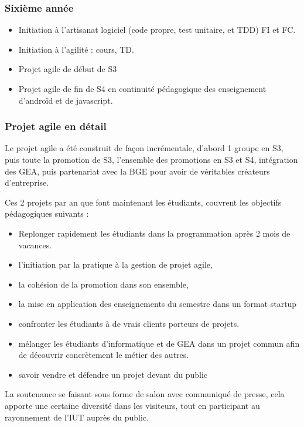 \documentclass[a4paper]{article}
\begin{document}
\subsubsection{Sixième année}
\begin{itemize}
  \item Initiation à l'artisanat logiciel (code propre, test unitaire, et TDD) FI et FC.
  \item Initiation à l'agilité : cours, TD.
  \item Projet agile de début de S3
  \item Projet agile de fin de S4 en continuité pédagogique des enseignement d'androïd et de javascript.
\end{itemize}

\subsubsection{Projet agile en détail}

Le projet agile a été construit de façon incrémentale, d'abord 1 groupe en S3, puis toute la promotion de S3, l'ensemble des promotions en S3 et S4, intégration des GEA, puis partenariat avec la BGE pour avoir de véritables créateurs d'entreprise.

Ces 2 projets par an que font maintenant les étudiants, couvrent les objectifs pédagogiques suivants : 
\begin{itemize}
\item Replonger rapidement les étudiants dans la programmation après 2 mois de vacances.
\item l'initiation par la pratique à la gestion de projet agile,
\item la cohésion de la promotion dans son ensemble,
\item la mise en application des enseignements du semestre dans un format startup
\item confronter les étudiants à de vrais clients porteurs de projets.
\item mélanger les étudiants d'informatique et de GEA dans un projet commun afin de découvrir concrètement le métier des autres.
\item savoir vendre et défendre un projet devant du public 
\end{itemize}

La soutenance se faisant sous forme de salon avec communiqué de presse, cela apporte une certaine diversité dans les visiteurs, tout en participant au rayonnement de l'IUT auprès du public.
\end{document}
